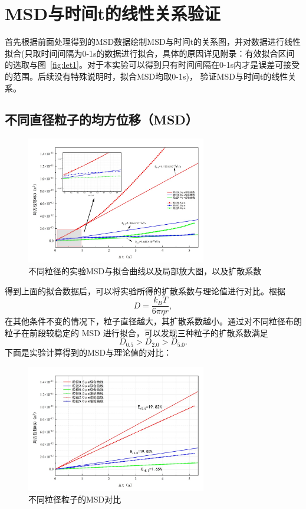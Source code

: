 \documentclass[a4paper]{report} %
\begin{document}
\section{MSD与时间t的线性关系验证}
首先根据前面处理得到的MSD数据绘制MSD与时间t的关系图，并对数据进行线性拟合(只取时间间隔为0-1s的数据进行拟合，具体的原因详见附录：有效拟合区间的选取与图~\ref{fig:let1}。对于本实验可以得到只有时间间隔在0-1s内才是误差可接受的范围。后续没有特殊说明时，拟合MSD均取0-1s)，
验证MSD与时间t的线性关系。 \par
\subsection{不同直径粒子的均方位移（MSD）}
\begin{figure}[H]
  \centering
  \includegraphics[width=0.7\textwidth]{实验数据拟合1.jpg}
  \caption{不同粒径的实验MSD与拟合曲线以及局部放大图，以及扩散系数}
  \label{fig:fit1}
\end{figure}
得到上面的拟合数据后，可以将实验所得的扩散系数与理论值进行对比。根据
\begin{equation}
    D = \frac{k_B T}{6 \pi \eta r},
\end{equation}
在其他条件不变的情况下，粒子直径越大，其扩散系数越小。通过对不同粒径布朗粒子在前段较稳定的 MSD 进行拟合，可以发现三种粒子的扩散系数满足
\[
    D_{0.5} > D_{2.0} > D_{5.0}.
\]
下面是实验计算得到的MSD与理论值的对比：
\begin{figure}[H]
  \centering
  \includegraphics[width=0.7\textwidth]{对比1.jpg}
  \caption{不同粒径粒子的MSD对比}
  \label{fig:fitall1}
\end{figure}
\newpage
\end{document}
